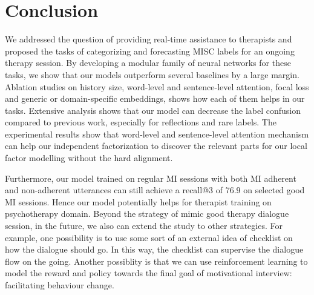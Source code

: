 \section{Conclusion}
\label{sec:snt:conclusion}

We addressed the question of providing real-time assistance to
therapists and proposed the tasks of categorizing and forecasting MISC
labels for an ongoing therapy session. By developing a modular family
of neural networks for these tasks, we show that our models outperform
several baselines by a large margin.  Ablation studies on history
size, word-level and sentence-level attention, focal loss and generic
or domain-specific embeddings, shows how each of them helps in our
tasks. Extensive analysis shows that our model can decrease the label
confusion compared to previous work, especially for reflections and
rare labels. The experimental results show that word-level and sentence-level attention
mechanism can help our independent factorization to discover the
relevant parts for our local factor modelling without the hard
alignment.

Furthermore, our model trained on regular MI sessions with both MI
adherent and non-adherent utterances can still achieve a recall@3 of
76.9 on selected good MI sessions. Hence our model potentially helps
for therapist training on psychotherapy domain. Beyond the strategy of
mimic good therapy dialogue session, in the future, we also can extend
the study to other strategies. For example, one possibility is to use
some sort of an external idea of checklist on how the dialogue should
go. In this way, the checklist can supervise the dialogue flow on the
going. Another possiblity is that we can use reinforcement learning to
model the reward and policy towards the final goal of motivational
interview: facilitating behaviour change.

